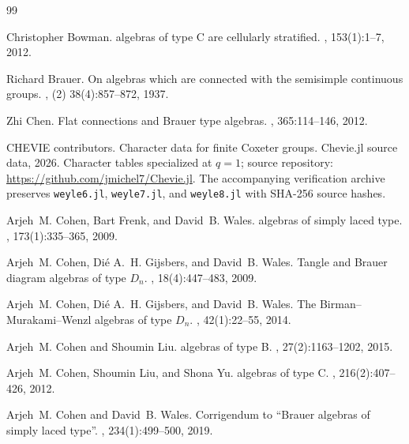 \documentclass[11pt,a4paper]{amsart}
\theoremstyle{uprightdefinition}
\theoremstyle{remark}\newtheorem{remark}[theorem]{Remark}
\begin{document}
\begingroup\small
\begin{thebibliography}{99}

Christopher Bowman.
 algebras of type {C} are cellularly stratified.
, 153(1):1--7, 2012.

Richard Brauer.
\newblock On algebras which are connected with the semisimple continuous groups.
, (2) 38(4):857--872, 1937.

Zhi Chen.
\newblock Flat connections and {Brauer} type algebras.
, 365:114--146, 2012.

{CHEVIE contributors}.
\newblock Character data for finite {Coxeter} groups.
\newblock Chevie.jl source data, 2026.
\newblock Character tables specialized at $q=1$; source repository: 
  \url{https://github.com/jmichel7/Chevie.jl}.
\newblock The accompanying verification archive preserves
  \texttt{weyle6.jl}, \texttt{weyle7.jl}, and \texttt{weyle8.jl}
  with SHA-256 source hashes.

Arjeh~M. Cohen, Bart Frenk, and David~B. Wales.
 algebras of simply laced type.
, 173(1):335--365, 2009.

Arjeh~M. Cohen, Di{\'e} A.~H. Gijsbers, and David~B. Wales.
\newblock Tangle and {Brauer} diagram algebras of type {$D_n$}.
, 18(4):447--483,
  2009.

Arjeh~M. Cohen, Di{\'e} A.~H. Gijsbers, and David~B. Wales.
\newblock The {Birman--Murakami--Wenzl} algebras of type {$D_n$}.
, 42(1):22--55, 2014.

Arjeh~M. Cohen and Shoumin Liu.
 algebras of type {B}.
, 27(2):1163--1202, 2015.

Arjeh~M. Cohen, Shoumin Liu, and Shona Yu.
 algebras of type {C}.
, 216(2):407--426, 2012.

Arjeh~M. Cohen and David~B. Wales.
\newblock Corrigendum to ``{Brauer} algebras of simply laced type''.
, 234(1):499--500, 2019.


\end{thebibliography}
\end{document}

